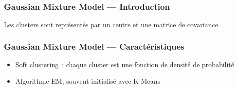 \begin{frame}
  \frametitle{Gaussian Mixture Model --- Introduction}
  Les clusters sont représentés par un centre et une matrice de covariance.
\end{frame}

\begin{frame}
  \frametitle{Gaussian Mixture Model --- Caractéristiques}
  \begin{itemize}[<+->]
    \item \og{}Soft\fg{} clustering~: chaque cluster est une fonction de densité de probabilité
    \item Algorithme EM, souvent initialisé avec K-Means
  \end{itemize}
\end{frame}
